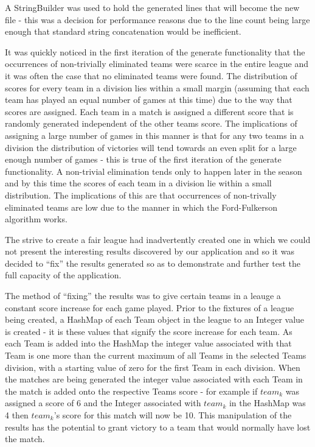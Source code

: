 A StringBuilder was used to hold the generated lines that will become
the new file - this was a decision for performance reasons due to the
line count being large enough that standard string concatenation would
be inefficient.

It was quickly noticed in the first iteration of the generate
functionality that the occurrences of non-trivially eliminated teams
were scarce in the entire league and it was often the case that no
eliminated teams were found. The distribution of scores for every team
in a division lies within a small margin (assuming that each team has
played an equal number of games at this time) due to the way that
scores are assigned. Each team in a match is assigned a different
score that is randomly generated independent of the other teams
score. The implications of assigning a large number of games in this
manner is that for any two teams in a division the distribution of
victories will tend towards an even split for a large enough number of
games - this is true of the first iteration of the generate
functionality. A non-trivial elimination tends only to happen later in
the season and by this time the scores of each team in a division lie
within a small distribution. The implications of this are that
occurrences of non-trivally eliminated teams are low due to the manner
in which the Ford-Fulkerson algorithm works.


The strive to create a fair league had inadvertently created one in
which we could not present the interesting results discovered by our
application and so it was decided to ``fix'' the results generated so as
to demonstrate and further test the full capacity of the application.

The method of ``fixing'' the results was to give certain teams in a
leauge a constant score increase for each game played.
Prior to the fixtures of a league being created, a HashMap of each
Team object in the league to an Integer value is created - it is
these values that signify the score increase for each team. As each
Team is added into the HashMap the integer value associated with that
Team is one more than the current maximum of all Teams in the selected
Teams division, with a starting value of zero for the first Team in
each division. When the matches are being generated the integer value
associated with each Team in the match is added onto the respective
Teams score - for example if $team_k$ was assigned a score of 6 and the
Integer associated with $team_k$ in the HashMap was 4 then $team_k$'s
score for this match will now be 10. This manipulation of the results
has the potential to grant victory to a team that would normally have
lost the match.

